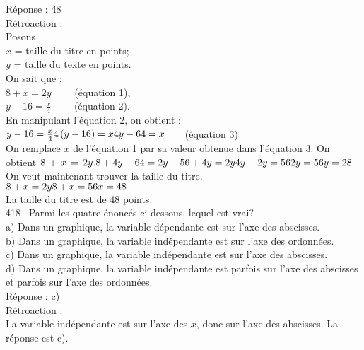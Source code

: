 ﻿\documentclass[letterpaper, 12pt]{article}
\begin{document}
R\'eponse : 48\\

R\'etroaction : \\
Posons\\
$x$ = taille du titre en points;\\
$y$ = taille du texte en points.\\

On sait que : \\
$8+x=2y \qquad $ (\'equation 1),\\
$y-16=\frac{x}{4} \qquad$ (\'equation 2).\\

En manipulant l'\'equation 2, on obtient :\\
$y-16=\frac{x}{4}\\
4\left( y-16\right) =x\\
4y-64=x \qquad $(\'equation 3)\\

On remplace $x$ de l'\'equation 1 par sa valeur obtenue dans l'\'equation 3.
On obtient $8\,+\,x\,=\,2y.\\
8+4y-64=2y\\
-56+4y=2y\\
4y-2y=56\\
2y=56\\
y=28$\\

On veut maintenant trouver la taille du titre.\\
$8+x=2y\\
8+x=56\\
x=48$\\

La taille du titre est de 48 points.\\


418-- Parmi les quatre \'enonc\'es ci-dessous, lequel est vrai?\\
a) Dans un graphique, la variable d\'ependante est sur l'axe des
abscisses.\\
b) Dans un graphique, la variable ind\'ependante est sur l'axe des
ordonn\'ees.\\
c) Dans un graphique, la variable ind\'ependante est sur l'axe des
abscisses.\\
d) Dans un graphique, la variable ind\'ependante est parfois sur l'axe des
abscisses et parfois sur l'axe des ordonn\'ees.\\

R\'eponse : c)\\

R\'etroaction :\\
La variable ind\'ependante est sur l'axe des $x$, donc sur l'axe des
abscisses.  La r\'eponse est c).\\
\end{document}

